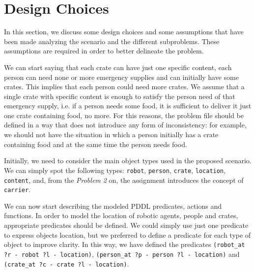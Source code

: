 
\section{Design Choices}
\label{sec3}

In this section, we discuss some design choices and some assumptions that have been made 
analyzing the scenario and the different subproblems. These assumptions are required 
in order to better delineate the problem.

We can start saying that each crate can have just one specific content, each person can need none or 
more emergency supplies and can initially have some crates. This implies that each person could need 
more crates.
We assume that a single crate with specific content is enough to satisfy the person need of that emergency 
supply, i.e. if a person needs some food, it is sufficient to deliver it just one crate containing food, no more. 
For this reasons, the problem file should be defined in a way that does not introduce any form of inconsistency:
for example, we should not have the situation in which a person initially has a crate containing food and at 
the same time the person needs food.



Initially, we need to consider the main object types used in the proposed scenario.
We can simply spot the following types: \texttt{robot}, \texttt{person}, \texttt{crate}, \texttt{location}, 
\texttt{content}, and, from the \textit{Problem 2} on, the assignment introduces the concept of \texttt{carrier}.

We can now start describing the modeled PDDL predicates, actions and functions.
In order to model the location of robotic agents, people and crates, appropriate predicates should be defined.
We could simply use just one predicate to express objects location, but we preferred to define a predicate for 
each type of object to improve clarity. In this way, we have defined the predicates 
\texttt{(robot\_at ?r - robot ?l - location)}, \texttt{(person\_at ?p - person ?l - location)} and 
\texttt{(crate\_at ?c - crate ?l - location)}.



